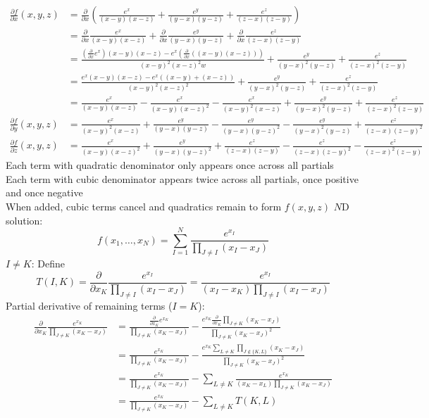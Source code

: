 \documentclass{article}
\begin{document}
\begin{align*}
  \frac{\partial f}{\partial x}(x, y, z)
  &= \frac{\partial}{\partial x}\left(\frac{e^x}{(x-y)(x-z)}+\frac{e^y}{(y-x)(y-z)}+\frac{e^z}{(z-x)(z-y)}\right) \\
  &= \frac{\partial}{\partial x}\frac{e^x}{(x-y)(x-z)}+\frac{\partial}{\partial x}\frac{e^y}{(y-x)(y-z)}+\frac{\partial}{\partial x}\frac{e^z}{(z-x)(z-y)} \\
  &= \frac{\left(\frac{\partial}{\partial x}e^x\right)(x-y)(x-z)-e^x\left(\frac{\partial}{\partial x}((x-y)(x-z))\right)}{(x-y)^2(x-z)^2w}+\frac{e^y}{(y-x)^2(y-z)}+\frac{e^z}{(z-x)^2(z-y)} \\
  &= \frac{e^x(x-y)(x-z)-e^x((x-y)+(x-z))}{(x-y)^2(x-z)^2}+\frac{e^y}{(y-x)^2(y-z)}+\frac{e^z}{(z-x)^2(z-y)} \\
  &= \frac{e^x}{(x-y)(x-z)}-\frac{e^x}{(x-y)(x-z)^2}-\frac{e^x}{(x-y)^2(x-z)}+\frac{e^y}{(y-x)^2(y-z)}+\frac{e^z}{(z-x)^2(z-y)} \\
  \frac{\partial f}{\partial y}(x, y, z)
  &= \frac{e^x}{(x-y)^2(x-z)}+\frac{e^y}{(y-x)(y-z)}-\frac{e^y}{(y-x)(y-z)^2}-\frac{e^y}{(y-x)^2(y-z)}+\frac{e^z}{(z-x)(z-y)^2} \\
  \frac{\partial f}{\partial z}(x, y, z)
  &= \frac{e^x}{(x-y)(x-z)^2}+\frac{e^y}{(y-x)(y-z)^2}+\frac{e^z}{(z-x)(z-y)}-\frac{e^z}{(z-x)(z-y)^2}-\frac{e^z}{(z-x)^2(z-y)}
\end{align*}
Each term with quadratic denominator only appears once across all partials \\
Each term with cubic denominator appears twice across all partials,
once positive and once negative \\
When added, cubic terms cancel and quadratics remain to form $f(x, y, z)$
\newpage
$N$D solution:
\[
f(x_1, \ldots, x_N) =
\sum_{I=1}^N\frac{e^{x_I}}{\prod\limits_{J \neq I}(x_I-x_J)}
\]
$I \neq K$: Define
\[T(I, K) = \frac{\partial}{\partial x_K} \frac{e^{x_I}}{\prod\limits_{J \neq I}(x_I-x_J)}
= \frac{e^{x_I}}{(x_I-x_K)\prod\limits_{J \neq I}(x_I-x_J)}\]
Partial derivative of remaining terms ($I=K$):
\begin{align*}
  \frac{\partial}{\partial x_K} \frac{e^{x_K}}{\prod\limits_{J \neq K}(x_K-x_J)}
  &= \frac{\frac{\partial}{\partial x_K}e^{x_K}}{\prod\limits_{J \neq K}(x_K-x_J)}-\frac{e^{x_K}\frac{\partial}{\partial x_K}\prod\limits_{J \neq K}(x_K-x_J)}{\prod\limits_{J \neq K}(x_K-x_J)^2} \\
  &= \frac{e^{x_K}}{\prod\limits_{J \neq K}(x_K-x_J)}-\frac{e^{x_K}\sum\limits_{L \neq K}\prod\limits_{J \not\in \{K, L\}}(x_K-x_J)}{\prod\limits_{J \neq K}(x_K-x_J)^2} \\
  &= \frac{e^{x_K}}{\prod\limits_{J \neq K}(x_K-x_J)}-\sum_{L \neq K}\frac{e^{x_K}}{(x_K-x_L)\prod\limits_{J \neq K}(x_K-x_J)} \\
  &= \frac{e^{x_K}}{\prod\limits_{J \neq K}(x_K-x_J)}-\sum_{L \neq K}T(K, L)
\end{align*}
\end{document}
